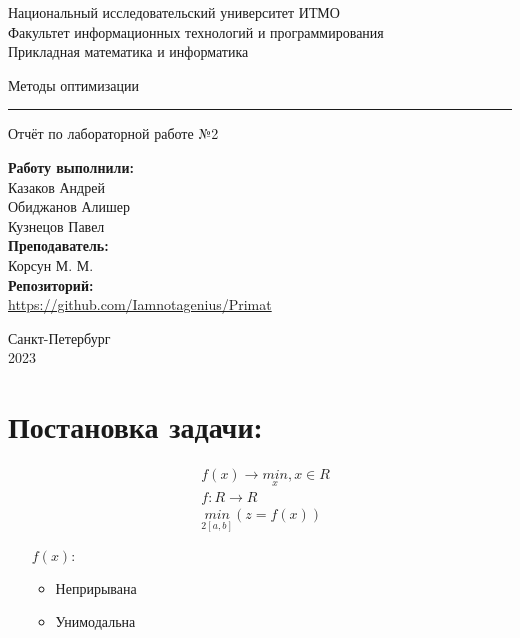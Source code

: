\documentclass[fleqn]{article}
\begin{document}
    \begin{center}
    Национальный исследовательский университет ИТМО \\
    Факультет информационных технологий и программирования \\
    Прикладная математика и информатика
\end{center}
\vspace{20em}
\begin{center}
    {\Large Методы оптимизации}
    \vspace{3pt}
    \hrule
    \vspace{3pt}
    Отчёт по лабораторной работе №2
\end{center}
\vspace{20em}
\begin{flushright}
    \textbf{ Работу выполнили: } \\
    Казаков Андрей \\
    Обиджанов Алишер \\
    Кузнецов Павел \\

    \vspace{1em}
    \textbf{ Преподаватель: } \\
    Корсун М. М.\\

    \vspace{1em}
    \textbf{ Репозиторий: }\\
    \url{https://github.com/Iamnotagenius/Primat}
\end{flushright}
\vspace{10em}
\begin{center}
    Санкт-Петербург \\
    2023
\end{center}

\newpage

\section{Постановка задачи:}
\begin{align*}
    &f(x) \rightarrow \underset{x}{min}, x \in R\\
    &f: R \rightarrow R\\
    &\underset{2[a,b]}{min}(z=f(x))
\end{align*}

\begin{itemize}
    \item [$f(x):$]
    \begin{itemize}
        \item Неприрывана
        \item Унимодальна
    \end{itemize}
\end{itemize}
\end{document}

